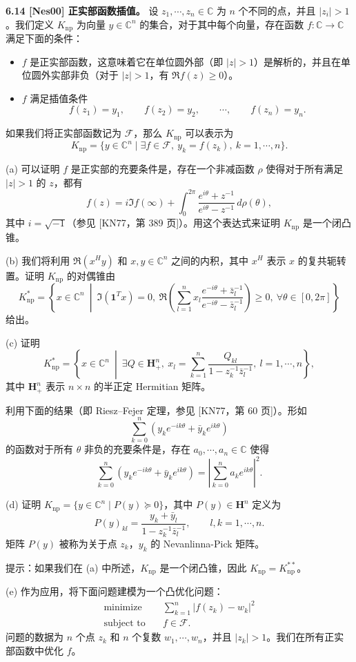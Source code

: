 \documentclass[UTF8,12pt,a4paper,fontset=fandol]{ctexart}
\begin{document}
\noindent\textbf{6.14 [Nes00] 正实部函数插值。}\quad
设 $z_1,\cdots,z_n\in\mathbb{C}$ 为 $n$ 个不同的点，并且 $|z_i|>1$。我们定义 $K_{\mathrm{np}}$ 为向量 $y\in\mathbb{C}^n$ 的集合，对于其中每个向量，存在函数 $f:\mathbb{C}\to\mathbb{C}$ 满足下面的条件：
\begin{itemize}
\item $f$ 是正实部函数，这意味着它在单位圆外部（即 $|z|>1$）是解析的，并且在单位圆外实部非负（对于 $|z|>1$，有 $\Re f(z)\geq 0$）。
\item $f$ 满足插值条件
\[
f(z_1)=y_1,\qquad f(z_2)=y_2,\qquad \cdots,\qquad f(z_n)=y_n.
\]
\end{itemize}
如果我们将正实部函数记为 $\mathcal{F}$，那么 $K_{\mathrm{np}}$ 可以表示为
\[
K_{\mathrm{np}}=\{y\in\mathbb{C}^n\mid \exists f\in\mathcal{F},\ y_k=f(z_k),\ k=1,\cdots,n\}.
\]

(a) 可以证明 $f$ 是正实部的充要条件是，存在一个非减函数 $\rho$ 使得对于所有满足 $|z|>1$ 的 $z$，都有
\[
f(z)=i\Im f(\infty)+\int_0^{2\pi}\frac{e^{i\theta}+z^{-1}}{e^{i\theta}-z^{-1}}\,d\rho(\theta),
\]
其中 $i=\sqrt{-1}$（参见 [KN77，第 389 页]）。用这个表达式来证明 $K_{\mathrm{np}}$ 是一个闭凸锥。

(b) 我们将利用 $\Re(x^Hy)$ 和 $x,y\in\mathbb{C}^n$ 之间的内积，其中 $x^H$ 表示 $x$ 的复共轭转置。证明 $K_{\mathrm{np}}$ 的对偶锥由
\[
K_{\mathrm{np}}^*=
\left\{x\in\mathbb{C}^n\ \middle|\ 
\Im(\mathbf{1}^Tx)=0,\ 
\Re\left(\sum_{l=1}^n x_l\frac{e^{-i\theta}+\bar{z}_l^{-1}}{e^{-i\theta}-\bar{z}_l^{-1}}\right)\geq 0,\ \forall\theta\in[0,2\pi]
\right\}
\]
给出。

(c) 证明
\[
K_{\mathrm{np}}^*=
\left\{x\in\mathbb{C}^n\ \middle|\ 
\exists Q\in\mathbf{H}_+^n,\ x_l=\sum_{k=1}^n\frac{Q_{kl}}{1-z_k^{-1}\bar{z}_l^{-1}},\ l=1,\cdots,n
\right\},
\]
其中 $\mathbf{H}_+^n$ 表示 $n\times n$ 的半正定 Hermitian 矩阵。

利用下面的结果（即 Riesz--Fejer 定理，参见 [KN77，第 60 页]）。形如
\[
\sum_{k=0}^n(y_ke^{-ik\theta}+\bar{y}_ke^{ik\theta})
\]
的函数对于所有 $\theta$ 非负的充要条件是，存在 $a_0,\cdots,a_n\in\mathbb{C}$ 使得
\[
\sum_{k=0}^n(y_ke^{-ik\theta}+\bar{y}_ke^{ik\theta})
=\left|\sum_{k=0}^n a_ke^{ik\theta}\right|^2.
\]

(d) 证明 $K_{\mathrm{np}}=\{y\in\mathbb{C}^n\mid P(y)\succeq 0\}$，其中 $P(y)\in\mathbf{H}^n$ 定义为
\[
P(y)_{kl}=\frac{y_k+\bar{y}_l}{1-z_k^{-1}\bar{z}_l^{-1}},\qquad l,k=1,\cdots,n.
\]
矩阵 $P(y)$ 被称为关于点 $z_k$，$y_k$ 的 Nevanlinna-Pick 矩阵。

提示：如果我们在 (a) 中所述，$K_{\mathrm{np}}$ 是一个闭凸锥，因此 $K_{\mathrm{np}}=K_{\mathrm{np}}^{**}$。

(e) 作为应用，将下面问题建模为一个凸优化问题：
\[
\begin{aligned}
\text{minimize}\quad & \sum_{k=1}^n |f(z_k)-w_k|^2\\
\text{subject to}\quad & f\in\mathcal{F}.
\end{aligned}
\]
问题的数据为 $n$ 个点 $z_k$ 和 $n$ 个复数 $w_1,\cdots,w_n$，并且 $|z_k|>1$。我们在所有正实部函数中优化 $f$。
\end{document}

